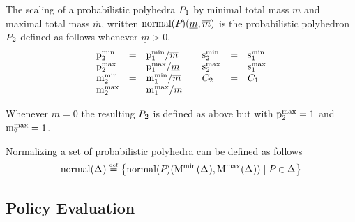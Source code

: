 \begin{definition}

\newcommand{\munder}{\underline{m}}
\newcommand{\mover}{\overline{m}}

The scaling of a probabilistic polyhedra $ P_{1} $ by minimal total
mass $\munder$ and maximal total mass $\mover$, written $
\normal{\pp{}}(\munder, \mover) $ is the probabilistic polyhedron $
P_{2} $ defined as follows whenever $ \munder > 0 $.
\[
\begin{array}{lcl@{\hspace{0.35cm}}|@{\hspace{0.35cm}}lcl}
\pmin{2} &=& \pmin{1} / \mover &
\smin{2} &=& \smin{1}\\
\pmax{2} &=& \pmax{1} / \munder &
\smax{2} &=&\smax{1} \\
\mmin{2} &=& \mmin{1} / \mover & \getpoly{2} &=& \getpoly{1} \\
\mmax{2} &=& \mmax{1} / \munder \\
\end{array}
\]

Whenever $ \munder = 0 $ the resulting $ P_{2} $ is 
defined as above but with $\mathrm{p}^\mathrm{max}_{2} = 1$ and $\mathrm{m}^\mathrm{max}_{2} = 1$.
\end{definition}

Normalizing a set of probabilistic polyhedra can be
defined as follows
$$ \text{normal}(\Delta_{}) \stackrel{\smash{\scriptscriptstyle \mathrm{def}}}=
\left\{ \text{normal}(P_{})(\mathrm{M}^\mathrm{min} (\Delta_{}), \mathrm{M}^\mathrm{max} (\Delta_{})) \mid P_{} \in \Delta_{} \right\} $$

%

\subsection{Policy Evaluation}
\label{sec:poly-eval}

